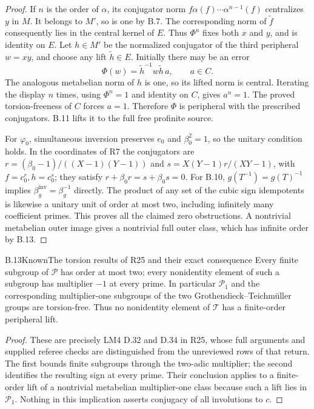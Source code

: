 \begin{proof}
If $n$ is the order of $\alpha$, its conjugator norm
$f\alpha(f)\cdots\alpha^{n-1}(f)$ centralizes $y$ in $M$.
It belongs to $M'$, so is one by B.7. The corresponding norm of
$\widetilde f$ consequently lies in the central kernel of $E$.
Thus $\Phi^n$ fixes both $x$ and $y$, and is identity on $E$.
Let $h\in M'$ be the normalized conjugator of the third peripheral
$w=xy$, and choose any lift $\widetilde h\in E$. Initially there
may be an error
\[
                 \Phi(w)=\widetilde h^{-1}w\widetilde h\,a,
                    \qquad a\in C.
\]
The analogous metabelian norm of $h$ is one, so its lifted norm
is central. Iterating the display $n$ times, using $\Phi^n=1$
and identity on $C$, gives $a^n=1$. The proved torsion-freeness
of $C$ forces $a=1$. Therefore $\Phi$ is peripheral with the
prescribed conjugators. B.11 lifts it to the full free profinite
source.

For $\varphi_0$, simultaneous inversion preserves $e_0$ and
$\beta_0^2=1$, so the unitary condition holds. In the coordinates
of R7 the conjugators are
$r=(\beta_0-1)/((X-1)(Y-1))$ and
$s=X(Y-1)r/(XY-1)$, with $f=c_0^r,h=c_0^s$;
they satisfy $r+\beta_0r=s+\beta_0s=0$. For B.10,
$g(T^{-1})=g(T)^{-1}$ implies
$\beta_g^{\mathrm{inv}}=\beta_g^{-1}$ directly. The product of
any set of the cubic sign idempotents is likewise a unitary unit
of order at most two, including infinitely many coefficient primes.
This proves all the claimed zero obstructions. A nontrivial
metabelian outer image gives a nontrivial full outer class, which
has infinite order by B.13.
\end{proof}

\begin{statement}{B.13}{Known}{The torsion results of R25 and their exact consequence}
Every finite subgroup of $\mathcal P$ has order at most two;
every nonidentity element of such a subgroup has multiplier $-1$
at every prime. In particular $\mathcal P_1$ and the corresponding
multiplier-one subgroups of the two Grothendieck--Teichm\"uller
groups are torsion-free. Thus no nonidentity element of
$\mathcal T$ has a finite-order peripheral lift.
\end{statement}
\begin{proof}
These are precisely LM4 D.32 and D.34 in R25, whose full arguments
and supplied referee checks are distinguished from the unreviewed
rows of that return. The first bounds finite subgroups through
the two-adic multiplier; the second identifies the resulting sign
at every prime. Their conclusion applies to a finite-order lift
of a nontrivial metabelian multiplier-one class because such a
lift lies in $\mathcal P_1$. Nothing in this implication asserts
conjugacy of all involutions to $c$.
\end{proof}

